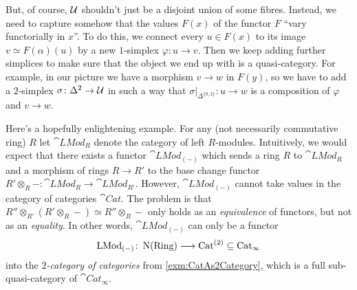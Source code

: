 \begin{numpar}
	But, of course, $\mathcal{U}$ shouldn't just be a disjoint union of some fibres. Instead, we need to capture somehow that the values $F(x)$ of the functor $F$ \enquote{vary functorially in $x$}. To do this, we connect every $u\in F(x)$ to its image $v\simeq F(\alpha)(u)$ by a new $1$-simplex $\varphi\colon u\rightarrow v$. Then we keep adding further simplices to make sure that the object we end up with is a quasi-category. For example, in our picture we have a morphism $v\rightarrow w$ in $F(y)$, so we have to add a $2$-simplex $\sigma\colon \Delta^2\rightarrow \mathcal{U}$ in such a way that $\sigma|_{\Delta^{\{0,2\}}}\colon u\rightarrow w$ is a composition of $\varphi$ and $v\rightarrow w$.
	
	Here's a hopefully enlightening example. For any (not necessarily commutative ring) $R$ let $\cat{LMod}_R$ denote the category of left $R$-modules. Intuitively, we would expect that there exists a functor $\cat{LMod}_{(-)}$ which sends a ring $R$ to $\cat{LMod}_R$ and a morphism of rings $R\rightarrow R'$ to the base change functor $R'\otimes_R-\colon \cat{LMod}_R\rightarrow \cat{LMod}_{R'}$. However, $\cat{LMod}_{(-)}$ cannot take values in the category of categories $\cat{Cat}$. The problem is that $R''\otimes_{R'}(R'\otimes_R-)\simeq R''\otimes_R-$ only holds as an \emph{equivalence} of functors, but not as an \emph{equality}. In other words, $\cat{LMod}_{(-)}$ can only be a functor
	\begin{equation*}
		\mathrm{LMod}_{(-)}\colon \operatorname{N}(\mathrm{Ring})\longrightarrow \mathrm{Cat}^{(2)}\subseteq \mathrm{Cat}_\infty
	\end{equation*}
	into the \emph{$2$-category of categories} from \cref{exm:CatAs2Category}, which is a full sub-quasi-category of $\cat{Cat}_\infty$.
	

\end{numpar}
